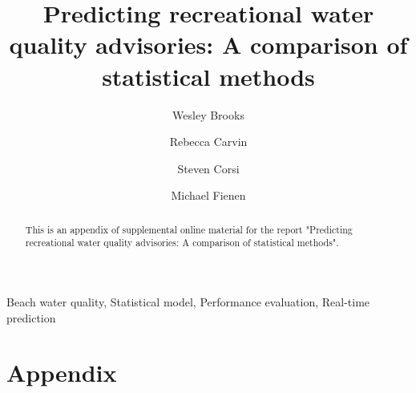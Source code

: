 \documentclass[authoryear,review, 12pt]{elsarticle}
\begin{document}
\begin{frontmatter}

\title{Predicting recreational water quality advisories: A comparison of statistical methods}

\author[usgs-wiwsc]{Wesley Brooks}

\author[usgs-wiwsc]{Rebecca Carvin}

\author[usgs-wiwsc]{Steven Corsi}

\author[usgs-wiwsc]{Michael Fienen}

\address[usgs-wiwsc]{Wisconsin Water Science Center, United States Geological Survey, 8505 Research Way, Middleton, WI 53562}

\begin{abstract}
This is an appendix of supplemental online material for the report "Predicting recreational water quality advisories: A comparison of statistical methods".
\end{abstract}

\begin{keyword}
Beach water quality, Statistical model, Performance evaluation, Real-time prediction
\end{keyword}

\end{frontmatter}

\section{Appendix}\label{appendix}
\end{document}

